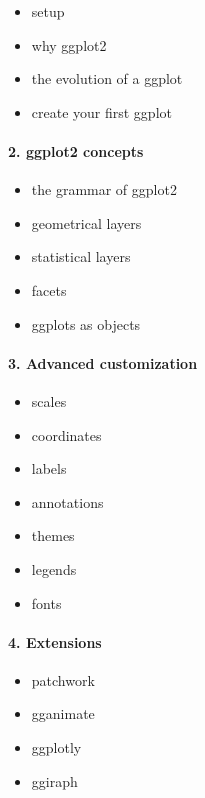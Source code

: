 \documentclass[
]{book}
\providecommand{\tightlist}{%
  \setlength{\itemsep}{0pt}\setlength{\parskip}{0pt}}
\begin{document}
\begin{itemize}
\tightlist
\item
  setup
\item
  why ggplot2
\item
  the evolution of a ggplot
\item
  create your first ggplot
\end{itemize}

\hypertarget{ggplot2-concepts}{%
\paragraph*{2. ggplot2 concepts}\label{ggplot2-concepts}}

\begin{itemize}
\tightlist
\item
  the grammar of ggplot2
\item
  geometrical layers
\item
  statistical layers
\item
  facets
\item
  ggplots as objects
\end{itemize}

\hypertarget{advanced-customization}{%
\paragraph*{3. Advanced customization}\label{advanced-customization}}

\begin{itemize}
\tightlist
\item
  scales
\item
  coordinates
\item
  labels
\item
  annotations
\item
  themes
\item
  legends
\item
  fonts
\end{itemize}

\hypertarget{extensions}{%
\paragraph*{4. Extensions}\label{extensions}}

\begin{itemize}
\tightlist
\item
  patchwork
\item
  gganimate
\item
  ggplotly
\item
  ggiraph
\end{itemize}
\end{document}
